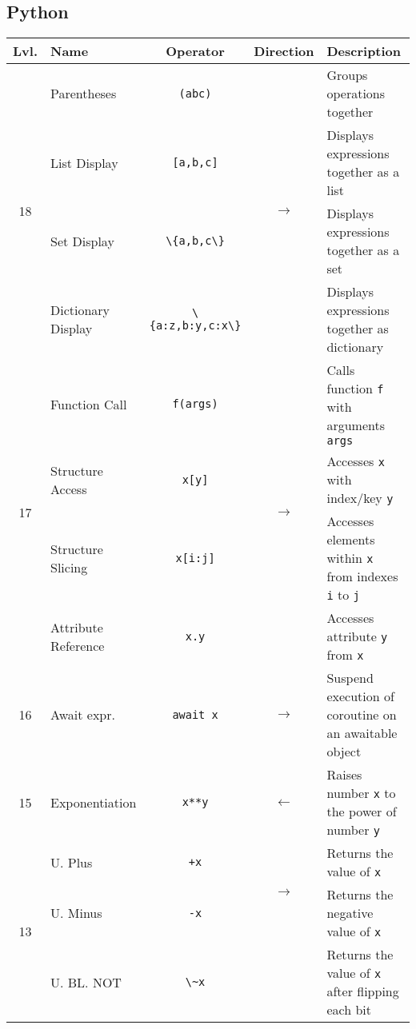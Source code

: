 \documentclass{article}
\begin{document}
\subsection{Python} %
\begin{center}\begin{tabularx}{\textwidth}{clccX}\toprule
  Lvl. & \quad Name & Operator & Direction & \qquad Description \\\midrule
  \multirow{4}{*}{18} & Parentheses & \lstinline|(abc)| & \multirow{4}{*}{\(\to\)} & Groups operations together \\
                      & List Display & \lstinline|[a,b,c]| & & Displays expressions together as a list\\
                      & Set Display & \lstinline|\{a,b,c\}| & & Displays expressions together as a set\\
                      & Dictionary Display & \lstinline|\{a:z,b:y,c:x\}| & & Displays expressions together as dictionary\\\midrule
  \multirow{4}{*}{17} & Function Call & \lstinline|f(args)| & \multirow{4}{*}{\(\to\)} & Calls function \lstinline|f| with arguments \lstinline|args|\\
                      & Structure Access & \lstinline|x[y]| & & Accesses \lstinline|x| with index/key \lstinline|y|\\
                      & Structure Slicing & \lstinline|x[i:j]| & & Accesses elements within \lstinline|x| from indexes \lstinline|i| to \lstinline|j|\\
                      & Attribute Reference & \lstinline|x.y| & & Accesses attribute \lstinline|y| from \lstinline|x|\\\midrule
  16 & Await expr. & \lstinline|await x| & \(\to\) & Suspend execution of coroutine on an awaitable object\\\midrule
  15 & Exponentiation & \lstinline|x**y| & \(\gets\) & Raises number \lstinline|x| to the power of number \lstinline|y|\\\midrule
  \multirow{3}{*}{13} & U. Plus & \lstinline|+x| & \multirow{2}{*}{\(\to\)} & Returns the value of \lstinline|x|\\
                      & U. Minus          & \lstinline|-x|  & & Returns the negative value of \lstinline|x|\\
                      & U. BL. NOT        & \lstinline|\~x| & & Returns the value of \lstinline|x| after flipping each bit\\\midrule

\end{tabularx}
\end{center}
\end{document}
